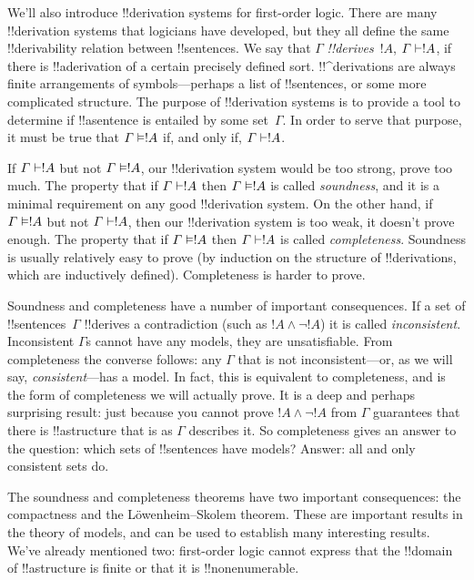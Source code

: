 \documentclass[../../../include/open-logic-section]{subfiles}
\begin{document}


We'll also introduce !!{derivation} systems for first-order logic.  There are
many !!{derivation} systems that logicians have developed, but they all define
the same !!{derivability} relation between !!{sentence}s. We say that
$\Gamma$ \emph{!!{derive}s}~$!A$, $\Gamma \Proves !A$, if there is
!!a{derivation} of a certain precisely defined sort. !!^{derivation}s
are always finite arrangements of symbols---perhaps a list of
!!{sentence}s, or some more complicated structure.  The purpose of
!!{derivation} systems is to provide a tool to determine if !!a{sentence} is
entailed by some set~$\Gamma$.  In order to serve that purpose, it
must be true that $\Gamma \Entails !A$ if, and only if, $\Gamma
\Proves !A$.

If $\Gamma \Proves !A$ but not $\Gamma \Entails !A$, our !!{derivation} system
would be too strong, prove too much.  The property that if $\Gamma
\Proves !A$ then $\Gamma \Entails !A$ is called \emph{soundness}, and
it is a minimal requirement on any good !!{derivation} system. On the other
hand, if $\Gamma \Entails !A$ but not $\Gamma \Proves !A$, then our
!!{derivation} system is too weak, it doesn't prove enough.  The property that
if $\Gamma \Entails !A$ then $\Gamma \Proves !A$ is called
\emph{completeness}. Soundness is usually relatively easy to prove (by
induction on the structure of !!{derivation}s, which are inductively
defined). Completeness is harder to prove.

Soundness and completeness have a number of important consequences. If
a set of !!{sentence}s~$\Gamma$ !!{derive}s a contradiction (such as
$!A \land \lnot !A$) it is called \emph{inconsistent}. Inconsistent
$\Gamma$s cannot have any models, they are unsatisfiable. From
completeness the converse follows: any $\Gamma$ that is not
inconsistent---or, as we will say, \emph{consistent}---has a model. In
fact, this is equivalent to completeness, and is the form of
completeness we will actually prove.  It is a deep and perhaps
surprising result: just because you cannot prove $!A \land \lnot !A$
from $\Gamma$ guarantees that there is !!a{structure} that is as
$\Gamma$ describes it.  So completeness gives an answer to the
question: which sets of !!{sentence}s have models? Answer: all and only
consistent sets do.

The soundness and completeness theorems have two important
consequences: the compactness and the L\"owenheim--Skolem theorem.
These are important results in the theory of models, and can be used
to establish many interesting results. We've already mentioned two:
first-order logic cannot express that the !!{domain} of !!a{structure}
is finite or that it is !!{nonenumerable}.
\end{document}
